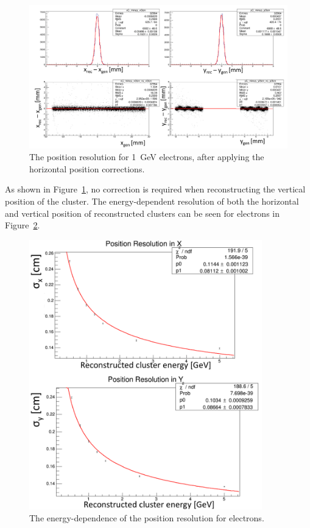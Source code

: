 \begin{figure}[H]
  \centering
      \includegraphics[width=1.0\textwidth]{pics/performance/corrPosnsFits.png}
  \caption[Position resolution for 1~GeV electrons.]{The position resolution for 1~GeV electrons, after applying the horizontal position corrections.}
  \label{Figure:corrPosnsFits}
\end{figure}

As shown in Figure~\ref{Figure:corrPosnsFits}, no correction is required when reconstructing the vertical position of the cluster. The energy-dependent resolution of both the horizontal and vertical position of reconstructed clusters can be seen for electrons in Figure~\ref{Figure:emPosnResn}. 

\begin{figure}[H]
  \centering
      \includegraphics[width=0.9\textwidth]{pics/performance/emPosnResn.png}
  \caption[Energy-dependent position resolution for electrons.]{The energy-dependence of the position resolution for electrons.}
  \label{Figure:emPosnResn}
\end{figure}

